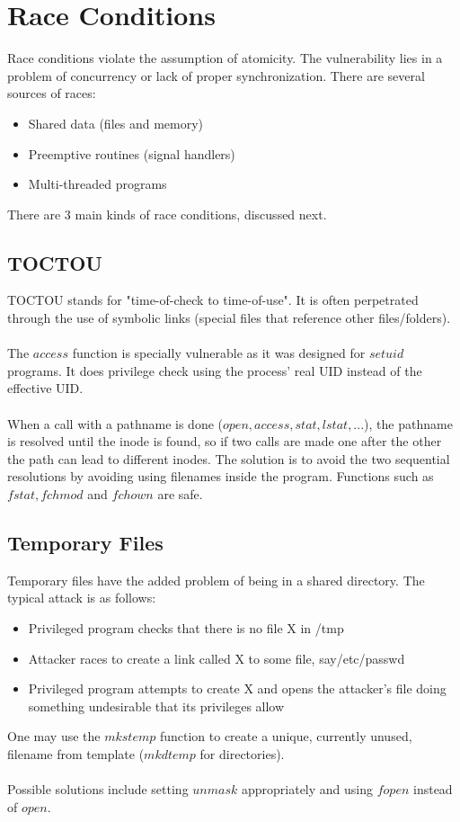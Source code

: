 \documentclass[10pt,a4paper]{report}
\begin{document}
\section{Race Conditions}
Race conditions violate the assumption of atomicity. The vulnerability lies in a problem of concurrency or lack of proper synchronization. There are several sources of races:
\begin{itemize}
\item Shared data (files and memory)
\item Preemptive routines (signal handlers)
\item Multi-threaded programs
\end{itemize}
There are 3 main kinds of race conditions, discussed next.
\subsection{TOCTOU}
TOCTOU stands for "time-of-check to time-of-use". It is often perpetrated through the use of symbolic links (special files that reference other files/folders).\\
\\
The $access$ function is specially vulnerable as it was designed for $setuid$ programs. It does privilege check using the process’ real UID instead of the effective UID.\\
\\
When a call with a pathname is done ($open, access, stat, lstat, ...$), the pathname is resolved until the inode is found, so if two calls are made one after the other the path can lead to different inodes. The solution is to  avoid the two sequential resolutions by avoiding using filenames inside the program. Functions such as $fstat, fchmod$ and $fchown$ are safe.
\subsection{Temporary Files}
Temporary files have the added problem of being in a shared directory. The typical attack is as follows:
\begin{itemize}
\item Privileged program checks that there is no file X in /tmp
\item Attacker races to create a link called X to some file, say/etc/passwd
\item Privileged program attempts to create X and opens the attacker’s file doing something undesirable that its privileges allow
\end{itemize}
One may use the $mkstemp$ function to create a unique, currently unused, filename from template ($mkdtemp$ for directories).\\
\\
Possible solutions include setting $unmask$ appropriately  and using $fopen$ instead of $open$.
\end{document}
